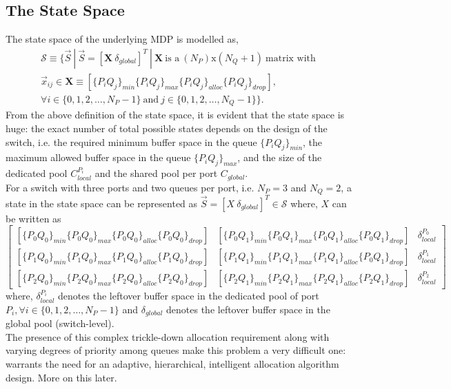 \documentclass{article}
\begin{document}
\subsection{The State Space}
The state space of the underlying MDP is modelled as,
\begin{equation}
    \begin{aligned}
        \mathcal{S} \equiv \{\vec{S}\ |\ \vec{S} = [\textbf{X}\ \delta_{global}]^T\ |\ \textbf{X}\ \text{is a}\ (N_P) \text{x} (N_Q+1)\ \text{matrix with}\ \\\vec{x}_{ij} \in \textbf{X} \equiv [\{P_i Q_j\}_{min} \{P_i Q_j\}_{max} \{P_i Q_j\}_{alloc} \{P_i Q_j\}_{drop}],\ \\
        \forall i \in \{0, 1, 2, \dots, N_P-1\}\ \text{and}\ j \in \{0, 1, 2, \dots, N_Q-1\}\}.
    \end{aligned}
\end{equation}
From the above definition of the state space, it is evident that the state space is huge: the exact number of total possible states depends on the design of the switch, i.e. the required minimum buffer space in the queue $\{P_i Q_j\}_{min}$, the maximum allowed buffer space in the queue $\{P_i Q_j\}_{max}$, and the size of the dedicated pool $C_{local}^{P_i}$ and the shared pool per port $C_{global}$.
\\For a switch with three ports and two queues per port, i.e. $N_P = 3$ and $N_Q = 2$, a state in the state space can be represented as $\vec{S} = [X\ \delta_{global}]^T \in \mathcal{S}$ where, $X$ can be written as
$$
\begin{bmatrix} 
[\{P_0 Q_0\}_{min} \{P_0 Q_0\}_{max} \{P_0 Q_0\}_{alloc} \{P_0 Q_0\}_{drop}] & [\{P_0 Q_1\}_{min} \{P_0 Q_1\}_{max} \{P_0 Q_1\}_{alloc} \{P_0 Q_1\}_{drop}] & \delta_{local}^{P_0}\\
[\{P_1 Q_0\}_{min} \{P_1 Q_0\}_{max} \{P_1 Q_0\}_{alloc} \{P_1 Q_0\}_{drop}] & [\{P_1 Q_1\}_{min} \{P_1 Q_1\}_{max} \{P_1 Q_1\}_{alloc} \{P_0 Q_1\}_{drop}] & \delta_{local}^{P_1}\\
[\{P_2 Q_0\}_{min} \{P_2 Q_0\}_{max} \{P_2 Q_0\}_{alloc} \{P_2 Q_0\}_{drop}] & [\{P_2 Q_1\}_{min} \{P_2 Q_1\}_{max} \{P_2 Q_1\}_{alloc} \{P_2 Q_1\}_{drop}] & \delta_{local}^{P_2}
\end{bmatrix}
$$
where, $\delta_{local}^{P_i}$ denotes the leftover buffer space in the dedicated pool of port $P_i, \forall i \in \{0, 1, 2, \dots, N_P-1\}$ and $\delta_{global}$ denotes the leftover buffer space in the global pool (switch-level). 
\\The presence of this complex trickle-down allocation requirement along with varying degrees of priority among queues make this problem a very difficult one: warrants the need for an adaptive, hierarchical, intelligent allocation algorithm design. More on this later.
\end{document}
